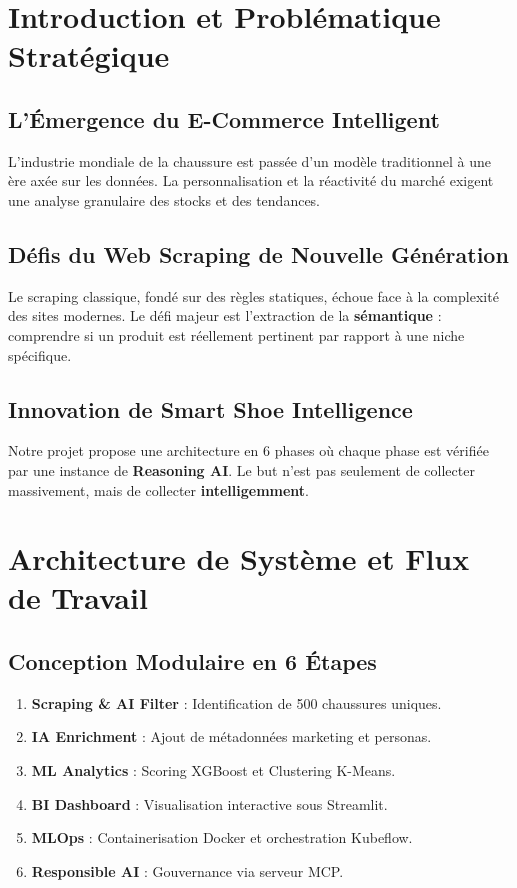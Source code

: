 \documentclass[11pt,a4paper,oneside]{report}
\begin{document}
    \newpage

    \chapter{Introduction et Problématique Stratégique}
    \section{L'Émergence du E-Commerce Intelligent}
    L'industrie mondiale de la chaussure est passée d'un modèle traditionnel à une ère axée sur les données. La personnalisation et la réactivité du marché exigent une analyse granulaire des stocks et des tendances.

    \section{Défis du Web Scraping de Nouvelle Génération}
    Le scraping classique, fondé sur des règles statiques, échoue face à la complexité des sites modernes. Le défi majeur est l'extraction de la \textbf{sémantique} : comprendre si un produit est réellement pertinent par rapport à une niche spécifique.

    \section{Innovation de Smart Shoe Intelligence}
    Notre projet propose une architecture en 6 phases où chaque phase est vérifiée par une instance de \textbf{Reasoning AI}. Le but n'est pas seulement de collecter massivement, mais de collecter \textbf{intelligemment}.

    \chapter{Architecture de Système et Flux de Travail}
    \section{Conception Modulaire en 6 Étapes}
    \begin{enumerate}
        \item \textbf{Scraping & AI Filter} : Identification de 500 chaussures uniques.
        \item \textbf{IA Enrichment} : Ajout de métadonnées marketing et personas.
        \item \textbf{ML Analytics} : Scoring XGBoost et Clustering K-Means.
        \item \textbf{BI Dashboard} : Visualisation interactive sous Streamlit.
        \item \textbf{MLOps} : Containerisation Docker et orchestration Kubeflow.
        \item \textbf{Responsible AI} : Gouvernance via serveur MCP.
    \end{enumerate}
\end{document}
